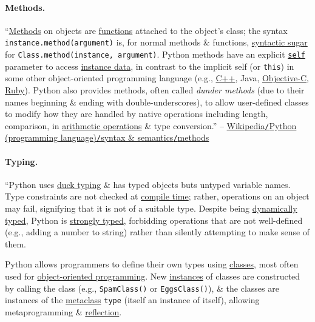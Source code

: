 \documentclass{article}
\numberwithin{equation}{section}
\begin{document}
\paragraph{Methods.} ``\href{https://en.wikipedia.org/wiki/Method_(programming)}{Methods} on objects are \href{https://en.wikipedia.org/wiki/Function_(programming)}{functions} attached to the object's class; the syntax \verb|instance.method(argument)| is, for normal methods \& functions, \href{https://en.wikipedia.org/wiki/Syntactic_sugar}{syntactic sugar} for \verb|Class.method(instance, argument)|. Python methods have an explicit \href{https://en.wikipedia.org/wiki/This_(computer_programming)}{\texttt{self}} parameter to access \href{https://en.wikipedia.org/wiki/Instance_data}{instance data}, in contrast to the implicit self (or \texttt{this}) in some other object-oriented programming language (e.g., \href{https://en.wikipedia.org/wiki/C%2B%2B}{C++}, Java, \href{https://en.wikipedia.org/wiki/Objective-C}{Objective-C}, \href{https://en.wikipedia.org/wiki/Ruby_(programming_language)}{Ruby}). Python also provides methods, often called \textit{dunder methods} (due to their names beginning \& ending with double-underscores), to allow user-defined classes to modify how they are handled by native operations including length, comparison, in \href{https://en.wikipedia.org/wiki/Arithmetic_operations}{arithmetic operations} \& type conversion.'' -- \href{https://en.wikipedia.org/wiki/Python_(programming_language)#Methods}{Wikipedia\texttt{/}Python (programming language)\texttt{/}syntax \& semantics\texttt{/}methods}

\paragraph{Typing.} ``Python uses \href{https://en.wikipedia.org/wiki/Duck_typing}{duck typing} \& has typed objects buts untyped variable names. Type constraints are not checked at \href{https://en.wikipedia.org/wiki/Compile_time}{compile time}; rather, operations on an object may fail, signifying that it is not of a suitable type. Despite being \href{https://en.wikipedia.org/wiki/Type_system#Dynamic_type_checking_and_runtime_type_information}{dynamically typed}, Python is \href{https://en.wikipedia.org/wiki/Strong_and_weak_typing}{strongly typed}, forbidding operations that are not well-defined (e.g., adding a number to string) rather than silently attempting to make sense of them.

Python allows programmers to define their own types using \href{https://en.wikipedia.org/wiki/Class_(computer_science)}{classes}, most often used for \href{https://en.wikipedia.org/wiki/Object-oriented_programming}{object-oriented programming}. New \href{https://en.wikipedia.org/wiki/Object_(computer_science)}{instances} of classes are constructed by calling the class (e.g., \texttt{SpamClass()} or \texttt{EggsClass()}), \& the classes are instances of the \href{https://en.wikipedia.org/wiki/Metaclass}{metaclass} \texttt{type} (itself an instance of itself), allowing metaprogramming \& \href{https://en.wikipedia.org/wiki/Reflection_(computer_science)}{reflection}.
\end{document}
